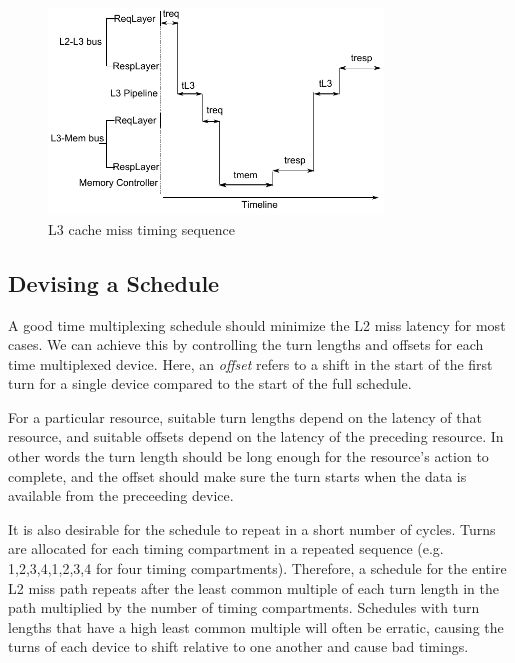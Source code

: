 \begin{figure}
    \begin{center}
        \includegraphics[width=3.5in]{figs/miss_timing.pdf}
        \caption{L3 cache miss timing sequence}
        \label{fig:miss_timing}
    \end{center}
\end{figure}

\subsection{Devising a Schedule}
A good time multiplexing schedule should minimize the L2 miss latency for most 
cases. We can achieve this by controlling the turn lengths and offsets for each 
time multiplexed device. Here, an \emph{offset} refers to a shift in the start 
of the first turn for a single device compared to the start of the full 
schedule.

For a particular resource, suitable turn lengths depend on the latency of that 
resource, and suitable offsets depend on the latency of the preceding resource. 
In other words the turn length should be long enough for the resource's action 
to complete, and the offset should make sure the turn starts when the data is 
available from the preceeding device.

It is also desirable for the schedule to repeat in a short number of cycles.
Turns are allocated for each timing compartment in a repeated sequence
(e.g. 1,2,3,4,1,2,3,4 for four timing compartments). Therefore, a schedule
for the entire L2 miss path repeats after the least common multiple of each turn
length in the path multiplied by the number of timing compartments. Schedules 
with turn lengths that have a high least common multiple will often be erratic, 
causing the turns of each device to shift relative to one another and cause bad 
timings.

